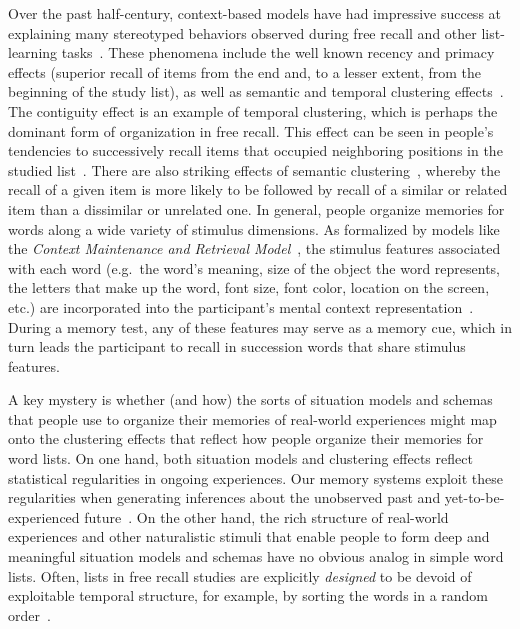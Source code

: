 \documentclass[11pt]{article}
\begin{document}
Over the past half-century, context-based models have had impressive success at
explaining many stereotyped behaviors observed during free recall and other
list-learning tasks~\citep{Este55a, RaaiShif80, GlenEtal83, HowaKaha02a,
SiroEtal05, KimbEtal07, PolyKaha08, SedeEtal08, PolyEtal09, ShanHowa12}. These
phenomena include the well known recency and primacy effects (superior recall
of items from the end and, to a lesser extent, from the beginning of the study
list), as well as semantic and temporal clustering effects~\citep{KahaEtal08b,
HowaKaha02b}. The contiguity effect is an example of temporal clustering, which
is perhaps the dominant form of organization in free recall. This effect can be
seen in people's tendencies to successively recall items that occupied
neighboring positions in the studied list~\citep{Kaha96}. There are also
striking effects of semantic clustering~\citep{RomnEtal93, Bous53, BousEtal54,
JenkRuss52, MannKaha12}, whereby the recall of a given item is more likely to
be followed by recall of a similar or related item than a dissimilar or
unrelated one. In general, people organize memories for words along a wide
variety of stimulus dimensions. As formalized by models like the
\textit{Context Maintenance and Retrieval Model}~\citep{PolyEtal09}, the
stimulus features associated with each word (e.g.\ the word's meaning, size of
the object the word represents, the letters that make up the word, font size,
font color, location on the screen, etc.) are incorporated into the
participant's mental context representation~\citep{SmitVela01, MannEtal11,
MannEtal12, MannEtal15, Mann20}. During a memory test, any of these features
may serve as a memory cue, which in turn leads the participant to recall in
succession words that share stimulus features.


A key mystery is whether (and how) the sorts of situation models and schemas
that people use to organize their memories of real-world experiences might map
onto the clustering effects that reflect how people organize their memories for
word lists. On one hand, both situation models and clustering effects reflect
statistical regularities in ongoing experiences. Our memory systems exploit
these regularities when generating inferences about the unobserved past and
yet-to-be-experienced future~\citep{XuEtal23, SchaTurk15, RangRitc12,
BoweEtal79, MomeEtal17}. On the other hand, the rich structure of real-world
experiences and other naturalistic stimuli that enable people to form deep and
meaningful situation models and schemas have no obvious analog in simple word
lists. Often, lists in free recall studies are explicitly \textit{designed} to
be devoid of exploitable temporal structure, for example, by sorting the words
in a random order~\citep{Kaha12}.
\end{document}
